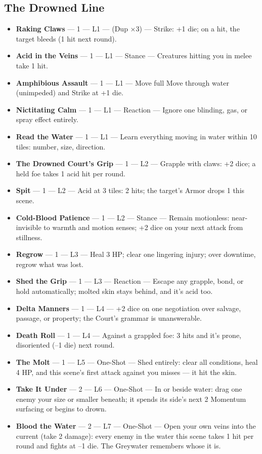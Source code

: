 \subsection{The Drowned Line}
\begin{itemize}
    \item \textbf{Raking Claws} --- 1 --- L1 --- (Dup ×3) --- Strike: +1 die; on a hit, the target bleeds (1 hit next round).
    \item \textbf{Acid in the Veins} --- 1 --- L1 --- Stance --- Creatures hitting you in melee take 1 hit.
    \item \textbf{Amphibious Assault} --- 1 --- L1 --- Move full Move through water (unimpeded) and Strike at +1 die.
    \item \textbf{Nictitating Calm} --- 1 --- L1 --- Reaction --- Ignore one blinding, gas, or spray effect entirely.
    \item \textbf{Read the Water} --- 1 --- L1 --- Learn everything moving in water within 10 tiles: number, size, direction.
    \item \textbf{The Drowned Court's Grip} --- 1 --- L2 --- Grapple with claws: +2 dice; a held foe takes 1 acid hit per round.
    \item \textbf{Spit} --- 1 --- L2 --- Acid at 3 tiles: 2 hits; the target's Armor drops 1 this scene.
    \item \textbf{Cold-Blood Patience} --- 1 --- L2 --- Stance --- Remain motionless: near-invisible to warmth and motion senses; +2 dice on your next attack from stillness.
    \item \textbf{Regrow} --- 1 --- L3 --- Heal 3 HP; clear one lingering injury; over downtime, regrow what was lost.
    \item \textbf{Shed the Grip} --- 1 --- L3 --- Reaction --- Escape any grapple, bond, or hold automatically; molted skin stays behind, and it's acid too.
    \item \textbf{Delta Manners} --- 1 --- L4 --- +2 dice on one negotiation over salvage, passage, or property; the Court's grammar is unanswerable.
    \item \textbf{Death Roll} --- 1 --- L4 --- Against a grappled foe: 3 hits and it's prone, disoriented (--1 die) next round.
    \item \textbf{The Molt} --- 1 --- L5 --- One-Shot --- Shed entirely: clear all conditions, heal 4 HP, and this scene's first attack against you misses --- it hit the skin.
    \item \textbf{Take It Under} --- 2 --- L6 --- One-Shot --- In or beside water: drag one enemy your size or smaller beneath; it spends its side's next 2 Momentum surfacing or begins to drown.
    \item \textbf{Blood the Water} --- 2 --- L7 --- One-Shot --- Open your own veins into the current (take 2 damage): every enemy in the water this scene takes 1 hit per round and fights at --1 die. The Greywater remembers whose it is.
\end{itemize}

